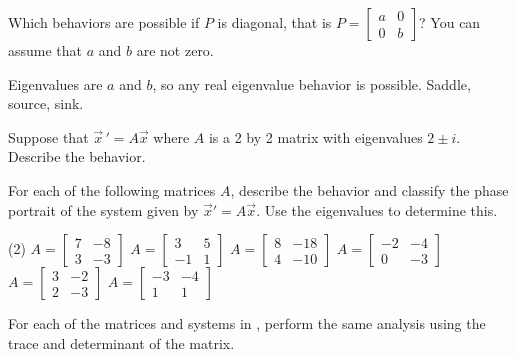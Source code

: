 \begin{exercise}
Which behaviors are possible if $P$ is diagonal, that is
$P = \left[ \begin{smallmatrix} a & 0 \\ 0 & b \end{smallmatrix} \right]$?
You can assume that $a$ and $b$ are not zero.
\end{exercise}
\comboSol{%
}
{%
Eigenvalues are $a$ and $b$, so any real eigenvalue behavior is possible. Saddle, source, sink.
}

\begin{exercise}\ansMark%
Suppose that $\vec{x}\,' = A \vec{x}$ where $A$ is a 2 by 2 matrix
with eigenvalues $2\pm i$.  Describe the behavior.
\end{exercise}

\begin{exercise}\ansMark\label{ex:TwoDimSys1}%
For each of the following matrices $A$, describe the behavior and classify the phase portrait of the system given by ${\vec{x}}' = A\vec{x}$. Use the eigenvalues to determine this.
\begin{tasks}(2)
\task $A = \begin{bmatrix} 7 & -8 \\ 3 & -3 \end{bmatrix}$
\task $A = \begin{bmatrix} 3 & 5 \\ -1 & 1 \end{bmatrix}$
\task $A = \begin{bmatrix} 8 & -18 \\ 4 & -10 \end{bmatrix}$
\task $A = \begin{bmatrix} -2 & -4 \\0 & -3 \end{bmatrix}$
\task $A = \begin{bmatrix} 3 & -2 \\ 2 & -3 \end{bmatrix}$
\task $A = \begin{bmatrix} -3 & -4 \\ 1 & 1 \end{bmatrix}$
\end{tasks}
\end{exercise}

\begin{exercise}
For each of the matrices and systems in , perform the same analysis using the trace and determinant of the matrix.
\end{exercise}

